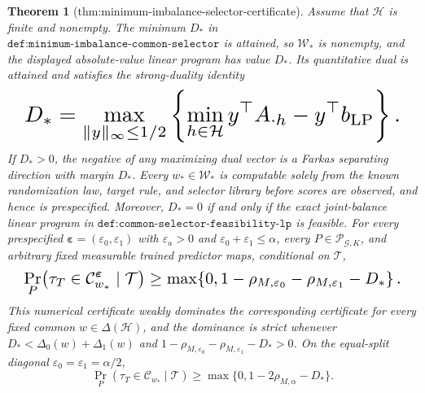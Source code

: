 \documentclass{article}
\newtheorem{theorem}{Theorem}
\begin{document}
\begin{theorem}[thm:minimum-imbalance-selector-certificate]\label{thm:minimum-imbalance-selector-certificate}
Assume that \(\mathcal H\) is finite and nonempty. The minimum \(D_*\) in \(\texttt{def:minimum-imbalance-common-selector}\) is attained, so \(\mathcal W_*\) is nonempty, and the displayed absolute-value linear program has value \(D_*\). Its quantitative dual is attained and satisfies the strong-duality identity
\[
\makebox[\linewidth][c]{\resizebox{0.98\linewidth}{!}{\par\noindent \makebox[\linewidth][c]{\resizebox{0.98\linewidth}{!}{\(\displaystyle \displaystyle D_*=\max_{\lVert y\rVert_\infty\le1/2}\left\{\min_{h\in\mathcal H}y^\top A_{\cdot h}-y^\top b_{\mathrm{LP}}\right\}.\)}}\par\noindent}}
\]
If \(D_*>0\), the negative of any maximizing dual vector is a Farkas separating direction with margin \(D_*\). Every \(w_*\in\mathcal W_*\) is computable solely from the known randomization law, target rule, and selector library before scores are observed, and hence is prespecified. Moreover, \(D_*=0\) if and only if the exact joint-balance linear program in \(\texttt{def:common-selector-feasibility-lp}\) is feasible. For every prespecified \(\boldsymbol\varepsilon=(\varepsilon_0,\varepsilon_1)\) with \(\varepsilon_a>0\) and \(\varepsilon_0+\varepsilon_1\le\alpha\), every \(P\in\mathcal P_{\mathcal G,K}\), and arbitrary fixed measurable trained predictor maps, conditional on \(\mathcal T\),
\[
\makebox[\linewidth][c]{\resizebox{0.98\linewidth}{!}{\par\noindent \makebox[\linewidth][c]{\resizebox{0.98\linewidth}{!}{\(\displaystyle \displaystyle \Pr_P\!\left(\tau_T\in\mathcal C^{\boldsymbol\varepsilon}_{w_*}\mid\mathcal T\right)\ge\max\!\left\{0,1-\rho_{M,\varepsilon_0}-\rho_{M,\varepsilon_1}-D_*\right\}.\)}}\par\noindent}}
\]
This numerical certificate weakly dominates the corresponding certificate for every fixed common \(w\in\Delta(\mathcal H)\), and the dominance is strict whenever \(D_*<\Delta_0(w)+\Delta_1(w)\) and \(1-\rho_{M,\varepsilon_0}-\rho_{M,\varepsilon_1}-D_*>0\). On the equal-split diagonal \(\varepsilon_0=\varepsilon_1=\alpha/2\),
\[
\Pr_P(\tau_T\in\mathcal C_{w_*}\mid\mathcal T)\ge\max\{0,1-2\rho_{M,\alpha}-D_*\}.
\]
\end{theorem}
\end{document}
